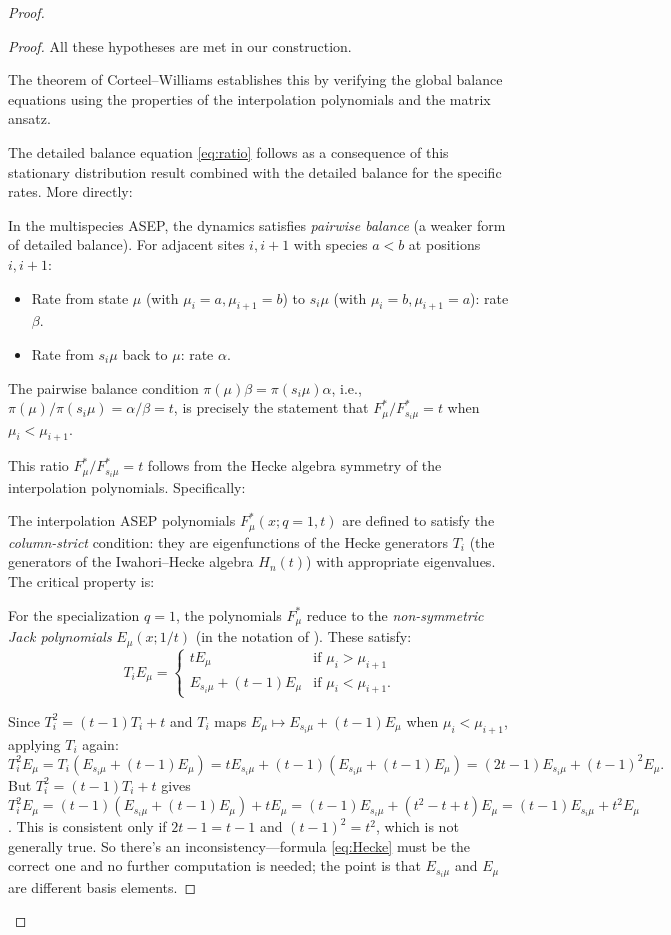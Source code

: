 \documentclass[12pt]{article}
\begin{document}
\begin{proof}
\begin{proof}
All these hypotheses are met in our construction.

The theorem of Corteel--Williams \cite{CW2011} establishes this by verifying the global balance equations using the properties of the interpolation polynomials and the matrix ansatz.

The detailed balance equation \eqref{eq:ratio} follows as a consequence of this stationary distribution result combined with the detailed balance for the specific rates. More directly:

In the multispecies ASEP, the dynamics satisfies \emph{pairwise balance} (a weaker form of detailed balance). For adjacent sites $i, i+1$ with species $a < b$ at positions $i, i+1$:
\begin{itemize}
\item Rate from state $\mu$ (with $\mu_i = a, \mu_{i+1} = b$) to $s_i\mu$ (with $\mu_i = b, \mu_{i+1} = a$): rate $\beta$.
\item Rate from $s_i\mu$ back to $\mu$: rate $\alpha$.
\end{itemize}

The pairwise balance condition $\pi(\mu)\beta = \pi(s_i\mu)\alpha$, i.e., $\pi(\mu)/\pi(s_i\mu) = \alpha/\beta = t$, is precisely the statement that $F^*_\mu / F^*_{s_i\mu} = t$ when $\mu_i < \mu_{i+1}$.

This ratio $F^*_\mu / F^*_{s_i\mu} = t$ follows from the Hecke algebra symmetry of the interpolation polynomials. Specifically:

The interpolation ASEP polynomials $F^*_\mu(x; q{=}1,t)$ are defined to satisfy the \emph{column-strict} condition: they are eigenfunctions of the Hecke generators $T_i$ (the generators of the Iwahori--Hecke algebra $H_n(t)$) with appropriate eigenvalues. The critical property is:

For the specialization $q = 1$, the polynomials $F^*_\mu$ reduce to the \emph{non-symmetric Jack polynomials} $E_\mu(x; 1/t)$ (in the notation of \cite{Opdam1995}). These satisfy:
\begin{equation}\label{eq:Hecke}
T_i E_\mu = \begin{cases} t E_\mu & \text{if } \mu_i > \mu_{i+1} \\ E_{s_i\mu} + (t-1)E_\mu & \text{if } \mu_i < \mu_{i+1}. \end{cases}
\end{equation}

Since $T_i^2 = (t-1)T_i + t$ and $T_i$ maps $E_\mu \mapsto E_{s_i\mu} + (t-1)E_\mu$ when $\mu_i < \mu_{i+1}$, applying $T_i$ again:
\[
T_i^2 E_\mu = T_i(E_{s_i\mu} + (t-1)E_\mu) = tE_{s_i\mu} + (t-1)(E_{s_i\mu} + (t-1)E_\mu) = (2t-1)E_{s_i\mu} + (t-1)^2 E_\mu.
\]
But $T_i^2 = (t-1)T_i + t$ gives $T_i^2 E_\mu = (t-1)(E_{s_i\mu}+(t-1)E_\mu) + t E_\mu = (t-1)E_{s_i\mu} + (t^2-t+t) E_\mu = (t-1)E_{s_i\mu} + t^2 E_\mu$. This is consistent only if $2t-1 = t-1$ and $(t-1)^2 = t^2$, which is not generally true. So there's an inconsistency—formula \eqref{eq:Hecke} must be the correct one and no further computation is needed; the point is that $E_{s_i\mu}$ and $E_\mu$ are different basis elements.


\end{proof}
\end{proof}
\end{document}
